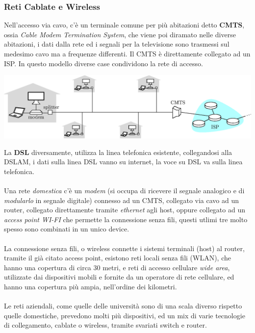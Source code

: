 \documentclass[12pt, letterpaper]{article}
\newcommand{\acc}{\\\hphantom{}\\}
\begin{document}
\subsubsection{Reti Cablate e Wireless}
Nell'accesso via cavo, c'è un terminale comune per più abitazioni detto \textbf{CMTS}, ossia \textit{Cable Modem Termination System},
che viene poi diramato nelle diverse abitazioni, i dati dalla rete ed i segnali per la televisione sono trasmessi sul medesimo 
cavo ma a frequenze differenti. Il CMTS è direttamente collegato ad un ISP. In questo modello diverse case condividono la rete di 
accesso.\begin{center}
    \includegraphics[width=1.1\textwidth ]{images/cableHeadend.eps}
\end{center}
La \textbf{DSL} diversamente, utilizza la linea telefonica esistente, collegandosi alla DSLAM, i dati sulla linea 
DSL vanno su internet, la voce su DSL va sulla linea telefonica. \acc 
Una rete \textit{domestica}  c'è un \textit{modem} 
(si occupa di ricevere il segnale analogico e di  \textit{modularlo} in segnale digitale)
 connesso ad un CMTS, collegato via cavo ad 
un router, collegato direttamente tramite \textit{ethernet} agli host, oppure collegato ad un \textit{access point WI-FI} che 
permette la connessione senza fili, questi utlimi tre molto spesso sono combinati in un unico device.\acc 
La connessione senza fili, o wireless connette i sistemi terminali (host) al router, tramite il già citato 
access point, esistono reti locali senza fili (WLAN), che hanno una copertura di circa 30 metri, e reti di accesso 
cellulare \textit{wide area}, utilizzate dai dispositivi mobili e fornite da un operatore di rete cellulare, ed hanno una 
copertura più ampia, nell'ordine dei kilometri.\acc 
Le reti aziendali, come quelle delle università sono di una scala diverso rispetto quelle domestiche, prevedono molti più 
dispositivi, ed un mix di varie tecnologie di collegamento, cablate o wireless, tramite svariati switch e router.
\end{document}
